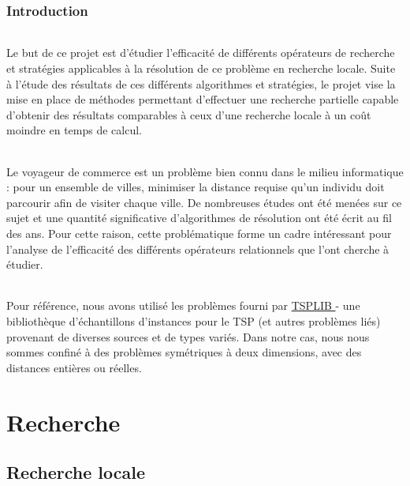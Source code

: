 \documentclass[a4paper,10pt]{report}
\begin{document}
\pagebreak
\section*{Introduction}

\paragraph{} %
  Le but de ce projet est d'étudier l'efficacité de différents opérateurs de
recherche et stratégies applicables à la résolution de ce problème en recherche
locale. Suite à l'étude des résultats de ces différents algorithmes et
stratégies, le projet vise la mise en place de méthodes permettant d'effectuer
une recherche partielle capable d'obtenir des résultats comparables à ceux d'une
recherche locale à un coût moindre en temps de calcul.
\paragraph{}
  Le voyageur de commerce est un problème bien connu dans le milieu informatique
: pour un ensemble de villes, minimiser la distance requise qu'un individu doit
parcourir afin de visiter chaque ville. De nombreuses études ont été menées sur
ce sujet et une quantité significative d'algorithmes de résolution ont été écrit
au fil des ans. Pour cette raison, cette problématique forme un cadre
intéressant pour l'analyse de l'efficacité des différents opérateurs
relationnels que l'ont cherche à étudier.

\paragraph{} %
  Pour référence, nous avons utilisé les problèmes fourni par
\href{https://www.iwr.uni-heidelberg.de/groups/comopt/software/TSPLIB95/}{TSPLIB
}
- une bibliothèque d'échantillons d'instances pour le TSP (et autres problèmes
liés) provenant de diverses sources et de types variés. Dans notre cas, nous
nous sommes confiné à des problèmes symétriques à deux dimensions, avec des
distances entières ou réelles.


\part{Recherche}
\chapter{Recherche locale}
\end{document}
